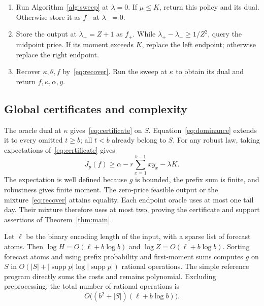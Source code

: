 \documentclass[manuscript,11pt,screen,nonacm]{acmart}
\DeclareMathOperator{\supp}{supp}
\begin{document}
\begin{algorithm}[ht]
\caption{Exact moment-price recovery; $Z$ is defined in~\eqref{eq:bound}.}
\label{alg:price}
\begin{enumerate}
\item Run Algorithm~\ref{alg:sweep} at $\lambda=0$. If $\mu\le K$, return
this policy and its dual. Otherwise store it as $f_-$ at $\lambda_-=0$.
\item Store the output at $\lambda_+=Z+1$ as $f_+$.
While $\lambda_+-\lambda_-\ge1/Z^2$, query the midpoint price.
If its moment exceeds $K$, replace the left endpoint; otherwise replace
the right endpoint.
\item Recover $\kappa,\theta,f$ by~\eqref{eq:recover}. Run the sweep at
$\kappa$ to obtain its dual and return $f,\kappa,\alpha,y$.
\end{enumerate}
\end{algorithm}

\subsection{Global certificates and complexity}
The oracle dual at $\kappa$ gives~\eqref{eq:certificate} on $S$.
Equation~\eqref{eq:dominance} extends it to every omitted $t\ge b$;
all $t<b$ already belong to $S$. For any robust law, taking expectations
of~\eqref{eq:certificate} gives
\[
 J_p(f)\ge\alpha-r\sum_{x=1}^{b-1}xy_x-\lambda K.
\]
The expectation is well defined because $g$ is bounded, the prefix sum
is finite, and robustness gives finite moment.
The zero-price feasible output or the mixture~\eqref{eq:recover} attains
equality. Each endpoint oracle uses at most one tail day. Their mixture
therefore uses at most two, proving the certificate and support assertions
of Theorem~\ref{thm:main}.

Let $\ell$ be the binary encoding length of the input, with a sparse list
of forecast atoms. Then $\log H=O(\ell+b\log b)$ and
$\log Z=O(\ell+b\log b)$. Sorting forecast atoms and using prefix
probability and first-moment sums computes $g$ on $S$ in
$O(|S|+|\supp p|\log|\supp p|)$ rational operations.
The simple reference program directly sums the costs and remains
polynomial. Excluding preprocessing, the total number of rational operations is
\[
 O\bigl((b^2+|S|)(\ell+b\log b)\bigr).
\]
\end{document}
